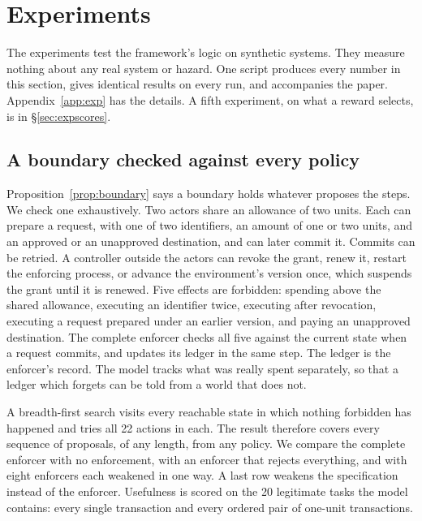 \documentclass[10pt,twocolumn,letterpaper]{article}
\theoremstyle{definition}
\newcommand{\BndTasks}{20}
\newcommand{\BndActions}{22}
\begin{document}
\section{Experiments}
\label{sec:experiments}

The experiments test the framework's logic on synthetic systems. They measure nothing about any real system or hazard. One script produces every number in this section, gives identical results on every run, and accompanies the paper. Appendix~\ref{app:exp} has the details. A fifth experiment, on what a reward selects, is in \S\ref{sec:expscores}.

\subsection{A boundary checked against every policy}
\label{sec:expboundary}

Proposition~\ref{prop:boundary} says a boundary holds whatever proposes the steps. We check one exhaustively. Two actors share an allowance of two units. Each can prepare a request, with one of two identifiers, an amount of one or two units, and an approved or an unapproved destination, and can later commit it. Commits can be retried. A controller outside the actors can revoke the grant, renew it, restart the enforcing process, or advance the environment's version once, which suspends the grant until it is renewed. Five effects are forbidden: spending above the shared allowance, executing an identifier twice, executing after revocation, executing a request prepared under an earlier version, and paying an unapproved destination. The complete enforcer checks all five against the current state when a request commits, and updates its ledger in the same step. The ledger is the enforcer's record. The model tracks what was really spent separately, so that a ledger which forgets can be told from a world that does not.

A breadth-first search visits every reachable state in which nothing forbidden has happened and tries all \BndActions{} actions in each. The result therefore covers every sequence of proposals, of any length, from any policy. We compare the complete enforcer with no enforcement, with an enforcer that rejects everything, and with eight enforcers each weakened in one way. A last row weakens the specification instead of the enforcer. Usefulness is scored on the \BndTasks{} legitimate tasks the model contains: every single transaction and every ordered pair of one-unit transactions.
\end{document}
